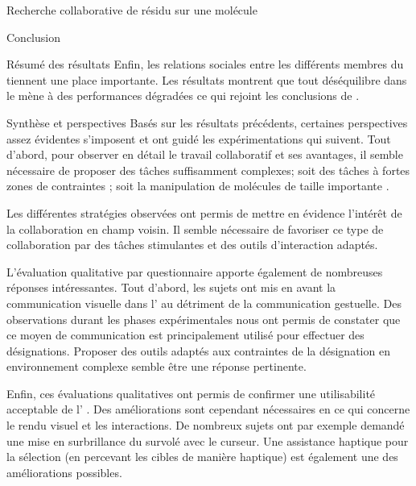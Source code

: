 \documentclass[myfrancais,ngerman,english,french]{mythesis}
\begin{document}
\begin{mychapter}{Recherche collaborative de résidu sur une molécule}
\begin{mysection}{Conclusion}
\begin{mysubsection}{Résumé des résultats}
				Enfin, les relations sociales entre les différents membres du  tiennent une place importante.
				Les résultats montrent que tout déséquilibre dans le  mène à des performances dégradées ce qui rejoint les conclusions de .
			\end{mysubsection}
			\begin{mysubsection}{Synthèse et perspectives}
				Basés sur les résultats précédents, certaines perspectives assez évidentes s'imposent et ont guidé les expérimentations qui suivent.
				Tout d'abord, pour observer en détail le travail collaboratif et ses avantages, il semble nécessaire de proposer des tâches suffisamment complexes; soit des tâches à fortes zones de contraintes ; soit la manipulation de molécules de taille importante .

				Les différentes stratégies observées ont permis de mettre en évidence l'intérêt de la collaboration en champ voisin.
				Il semble nécessaire de favoriser ce type de collaboration par des tâches stimulantes et des outils d'interaction adaptés.

				L'évaluation qualitative par questionnaire apporte également de nombreuses réponses intéressantes.
				Tout d'abord, les sujets ont mis en avant la communication visuelle dans l' au détriment de la communication gestuelle.
				Des observations durant les phases expérimentales nous ont permis de constater que ce moyen de communication est principalement utilisé pour effectuer des désignations.
				Proposer des outils adaptés aux contraintes de la désignation en environnement complexe semble être une réponse pertinente.

				Enfin, ces évaluations qualitatives ont permis de confirmer une utilisabilité acceptable de l' \myShaddock.
				Des améliorations sont cependant nécessaires en ce qui concerne le rendu visuel et les interactions.
				De nombreux sujets ont par exemple demandé une mise en surbrillance du  survolé avec le curseur.
				Une assistance haptique pour la sélection (en percevant les cibles de manière haptique) est également une des améliorations possibles.
			\end{mysubsection}
		\end{mysection}
	\end{mychapter}
\end{document}
